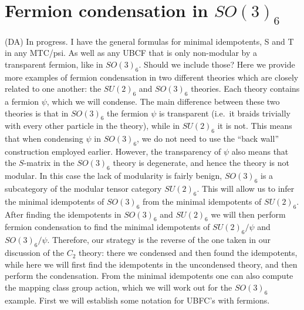 \documentclass[12pt,a4paper]{article}
\newcommand{\zt}{\mathbb{Z}_2}
\newcommand{\dave}[1]{{\color{ao(english)}\footnotesize{(DA) #1}}}
\newcommand{\kw}[1]{{\color{kwcolor}\footnotesize{(KW) #1}}}
\begin{document}
\section{Fermion condensation in $SO(3)_6$} \label{so36}
\dave{In progress. I have the general formulas for minimal idempotents, S and T in any MTC/psi. 
As well as any UBCF that is only non-modular by a transparent fermion, like in $SO(3)_6$.
Should we include those?}
Here we provide more examples of fermion condensation in two different theories which are closely related to one another:
the $SU(2)_6$ and $SO(3)_6$ theories. 
Each theory contains a fermion $\psi$, which we will condense. 
The main difference between these two theories is that in $SO(3)_6$ the fermion $\psi$ is transparent (i.e.\ it braids trivially with every other particle in the theory), while in $SU(2)_6$ it is not. 
This means that when condensing $\psi$ in $SO(3)_6$, we do not need to use the ``back wall'' construction employed earlier. 
However, the transparency of $\psi$ also means that the $S$-matrix in the $SO(3)_6$ theory is degenerate, and hence the theory is not modular. 
In this case the lack of modularity is fairly benign, $SO(3)_6$ is a subcategory of the modular tensor category $SU(2)_6$.
This will allow us to infer the minimal idempotents of $SO(3)_6$ from the minimal idempotents of $SU(2)_6$.
After finding the idempotents in $SO(3)_6$ and $SU(2)_6$ we will then perform fermion condensation to find the minimal idempotents of $SU(2)_6/\psi$ and $SO(3)_6/\psi$. 
Therefore, our strategy is the reverse of the one taken in our discussion of the $C_2$ theory: there we condensed and then found the idempotents, while here we will first find the idempotents in the uncondensed theory, 
and then perform the condensation.
From the minimal idempotents one can also compute the mapping class group action, which we will work out for the $SO(3)_6$ example.
First we will establish some notation for UBFC's with fermions.
\end{document}
